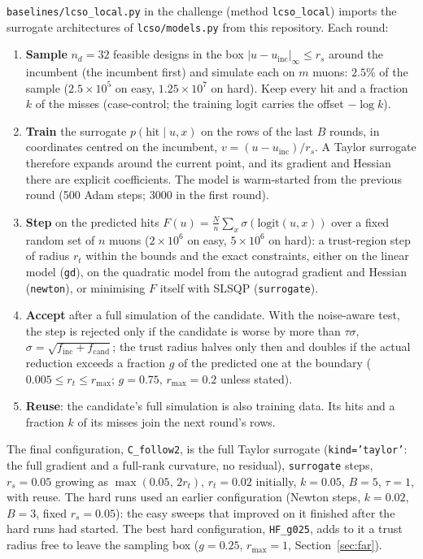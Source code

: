 \documentclass[11pt,a4paper]{article}
\begin{document}
\texttt{baselines/lcso\_local.py} in the challenge (method \texttt{lcso\_local}) imports the
surrogate architectures of \texttt{lcso/models.py} from this repository. Each round:
\begin{enumerate}
  \item \textbf{Sample} $n_d=32$ feasible designs in the box $|u-u_\text{inc}|_\infty\le r_s$ around the
        incumbent (the incumbent first) and simulate each on $m$ muons: $2.5\%$ of the sample
        ($2.5\times10^5$ on easy, $1.25\times10^7$ on hard). Keep every hit and a fraction $k$ of the
        misses (case-control; the training logit carries the offset $-\log k$).
  \item \textbf{Train} the surrogate $p(\text{hit}\mid u,x)$ on the rows of the last $B$ rounds, in
        coordinates centred on the incumbent, $v=(u-u_\text{inc})/r_s$. A Taylor surrogate therefore
        expands around the current point, and its gradient and Hessian there are explicit
        coefficients. The model is warm-started from the previous round (500 Adam steps; 3000 in
        the first round).
  \item \textbf{Step} on the predicted hits $F(u)=\tfrac{N}{n}\sum_{x}\sigma(\text{logit}(u,x))$
        over a fixed random set of $n$ muons ($2\times10^6$ on easy, $5\times10^6$ on hard):
        a trust-region step of radius $r_t$ within the bounds and the exact constraints, either
        on the linear model (\texttt{gd}), on the quadratic model from the autograd gradient and
        Hessian (\texttt{newton}), or minimising $F$ itself with SLSQP (\texttt{surrogate}).
  \item \textbf{Accept} after a full simulation of the candidate. With the noise-aware test, the step
        is rejected only if the candidate is worse by more than $\tau\sigma$,
        $\sigma=\sqrt{f_\text{inc}+f_\text{cand}}$; the trust radius halves only then and doubles if the
        actual reduction exceeds a fraction $g$ of the predicted one at the boundary
        ($0.005\le r_t\le r_\text{max}$; $g=0.75$, $r_\text{max}=0.2$ unless stated).
  \item \textbf{Reuse}: the candidate's full simulation is also training data. Its hits and a
        fraction $k$ of its misses join the next round's rows.
\end{enumerate}
The final configuration, \texttt{C\_follow2}, is the full Taylor surrogate (\texttt{kind='taylor'}:
the full gradient and a full-rank curvature, no residual), \texttt{surrogate} steps, $r_s=0.05$
growing as $\max(0.05,\,2r_t)$, $r_t=0.02$ initially, $k=0.05$, $B=5$, $\tau=1$, with reuse. The
hard runs used an earlier configuration (Newton steps, $k=0.02$, $B=3$, fixed $r_s=0.05$): the easy
sweeps that improved on it finished after the hard runs had started. The best hard configuration,
\texttt{HF\_g025}, adds to it a trust radius free to leave the sampling box ($g=0.25$,
$r_\text{max}=1$, Section~\ref{sec:far}).
\end{document}
